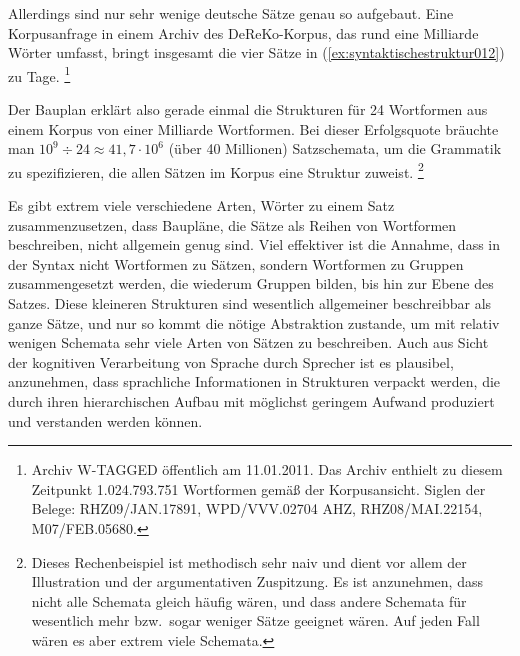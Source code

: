 Allerdings sind nur sehr wenige deutsche Sätze genau so aufgebaut.
Eine Korpusanfrage in einem Archiv des DeReKo-Korpus, das rund eine Milliarde Wörter umfasst, bringt insgesamt die vier Sätze in (\ref{ex:syntaktischestruktur012}) zu Tage.%
\footnote{Archiv W-TAGGED öffentlich am 11.01.2011.
Das Archiv enthielt zu diesem Zeitpunkt 1.024.793.751 Wortformen gemäß der Korpusansicht.
Siglen der Belege: RHZ09/JAN.17891, WPD/VVV.02704 AHZ, RHZ08/MAI.22154, M07/FEB.05680.}

\begin{exe}
  \ex \label{ex:syntaktischestruktur012}
  \begin{xlist}
  \end{xlist}
\end{exe}

Der Bauplan erklärt also gerade einmal die Strukturen für 24 Wortformen aus einem Korpus von einer Milliarde Wortformen.
Bei dieser Erfolgsquote bräuchte man $10^9\div24\approx41,7\cdot10^6$ (über 40 Millionen) Satzschemata, um die Grammatik zu spezifizieren, die allen Sätzen im Korpus eine Struktur zuweist.%
\footnote{Dieses Rechenbeispiel ist methodisch sehr naiv und dient vor allem der Illustration und der argumentativen Zuspitzung.
Es ist \zB anzunehmen, dass nicht alle Schemata gleich häufig wären, und dass andere Schemata für wesentlich mehr bzw.\ sogar weniger Sätze geeignet wären.
Auf jeden Fall wären es aber extrem viele Schemata.}

Es gibt extrem viele verschiedene Arten, Wörter zu einem Satz zusammenzusetzen, dass Baupläne, die Sätze als Reihen von Wortformen beschreiben, nicht allgemein genug sind.
Viel effektiver ist die Annahme, dass in der Syntax nicht Wortformen zu Sätzen, sondern Wortformen zu Gruppen zusammengesetzt werden, die wiederum Gruppen bilden, bis hin zur Ebene des Satzes.
Diese kleineren Strukturen sind wesentlich allgemeiner beschreibbar als ganze Sätze, und nur so kommt die nötige Abstraktion zustande, um mit relativ wenigen Schemata sehr viele Arten von Sätzen zu beschreiben.
Auch aus Sicht der kognitiven Verarbeitung von Sprache durch Sprecher ist es plausibel, anzunehmen, dass sprachliche Informationen in Strukturen verpackt werden, die durch ihren hierarchischen Aufbau mit möglichst geringem Aufwand produziert und verstanden werden können.

